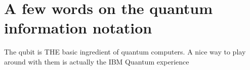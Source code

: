 \section{A few words on the quantum information notation}

The qubit is THE basic ingredient of quantum computers. A nice way to play around with them is actually the IBM Quantum experience